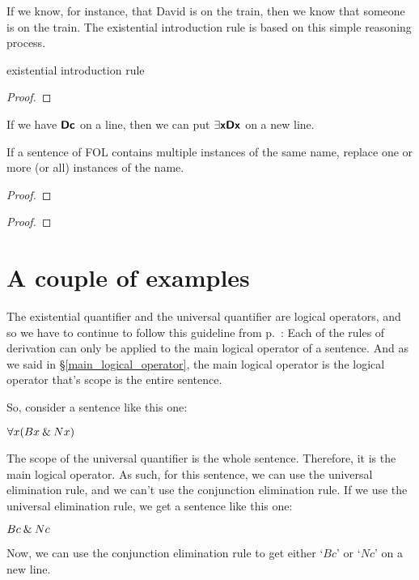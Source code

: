 If we know, for instance, that David is on the train, then we know that someone is on the train. The existential introduction rule is based on this simple reasoning process.

\begin{factboxy}{existential introduction rule}
\begin{proof}
	 
\end{proof}

\small{If we have $\bm{\mathsf{Dc}}$ on a line, then we can put $\exists \bm{\mathsf{x Dx}}$ on a new line.
\smallskip

If a sentence of FOL contains multiple instances of the same name, replace one or more (or all) instances of the name.}

\begin{proof}
	 
\end{proof}

\begin{proof}
	 
\end{proof}

\end{factboxy}


\section{A couple of examples}

The existential quantifier and the universal quantifier are logical operators, and so we have to continue to follow this guideline from p.~\pageref{rule-proofs-main-operator}: {Each of the rules of derivation can only be applied to the main logical operator of a sentence}. And as we said in \S \ref{main_logical_operator}, the main logical operator is the logical operator that's scope is the entire sentence. 

So, consider a sentence like this one:

\begin{ebullet}
\item[] $\forall x(Bx \mathbin{\&} Nx)$
\end{ebullet}
The scope of the universal quantifier is the whole sentence. Therefore, it is the main logical operator. As such, for this sentence, we can use the universal elimination rule, and we can't use the conjunction elimination rule. If we use the universal elimination rule, we get a sentence like this one:
\begin{ebullet}
\item[] $Bc \mathbin{\&} Nc$
\end{ebullet}
Now, we can use the conjunction elimination rule to get either `$Bc$' or `$Nc$' on a new line. %

